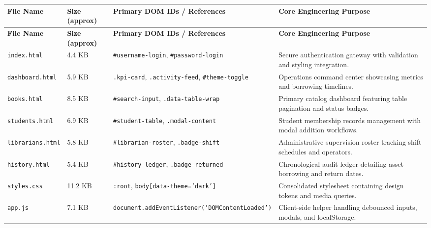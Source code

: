 \documentclass[10pt,journal,compsoc]{IEEEtran}
\begin{document}
\vspace{10pt}
\noindent
\begin{center}
\renewcommand{\arraystretch}{1.25}
\begin{longtable}{|L{2.6cm}|L{2.0cm}|L{5.0cm}|L{5.5cm}|}
\hline
{}
\textbf{\color{white}File Name} & \textbf{\color{white}Size (approx)} & \textbf{\color{white}Primary DOM IDs / References} & \textbf{\color{white}Core Engineering Purpose} \\
\hline
\endfirsthead
\hline
{}
\textbf{\color{white}File Name} & \textbf{\color{white}Size (approx)} & \textbf{\color{white}Primary DOM IDs / References} & \textbf{\color{white}Core Engineering Purpose} \\
\hline
\endhead
\texttt{index.html} & 4.4 KB & \texttt{\#username-login}, \texttt{\#password-login} & Secure authentication gateway with validation and styling integration. \\
\hline
{}
\texttt{dashboard.html} & 5.9 KB & \texttt{.kpi-card}, \texttt{.activity-feed}, \texttt{\#theme-toggle} & Operations command center showcasing metrics and borrowing timelines. \\
\hline
\texttt{books.html} & 8.5 KB & \texttt{\#search-input}, \texttt{.data-table-wrap} & Primary catalog dashboard featuring table pagination and status badges. \\
\hline
{}
\texttt{students.html} & 6.9 KB & \texttt{\#student-table}, \texttt{.modal-content} & Student membership records management with modal addition workflows. \\
\hline
\texttt{librarians.html} & 5.8 KB & \texttt{\#librarian-roster}, \texttt{.badge-shift} & Administrative supervision roster tracking shift schedules and operators. \\
\hline
{}
\texttt{history.html} & 5.4 KB & \texttt{\#history-ledger}, \texttt{.badge-returned} & Chronological audit ledger detailing asset borrowing and return dates. \\
\hline
\texttt{styles.css} & 11.2 KB & \texttt{:root}, \texttt{body[data-theme='dark']} & Consolidated stylesheet containing design tokens and media queries. \\
\hline
{}
\texttt{app.js} & 7.1 KB & \texttt{document.addEventListener('DOMContentLoaded')} & Client-side helper handling debounced inputs, modals, and localStorage. \\
\hline
\end{longtable}
\end{center}
\end{document}
